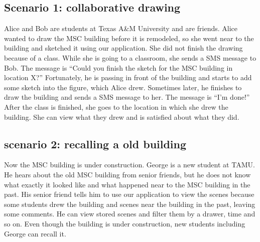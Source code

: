 \documentclass{www2010-submission}
\begin{document}
\subsection{Scenario 1: collaborative drawing}

Alice and Bob are students at Texas A\&M University and are friends. Alice
wanted to draw the MSC building before it is remodeled, so she went near to the
building and sketched it using our application. She did not finish the drawing
because of a class. While she is going to a classroom, she sends a SMS message
to Bob. The message is ``Could you finish the sketch for the MSC building in
location X?'' Fortunately, he is passing in front of the building and starts to
add some sketch into the figure, which Alice drew. Sometimes later, he finishes
to draw the building and sends a SMS message to her. The message is ``I'm
done!'' After the class is finished, she goes to the location in which she drew
the building. She can view what they drew and is satisfied about what they did.

\subsection{scenario 2: recalling a old building}

Now the MSC building is under construction. George is a new student at TAMU. He
hears about the old MSC building from senior friends, but he does not know what
exactly it looked like and what happened near to the MSC building in the past.
His senior friend tells him to use our application to view the scenes because
some students drew the building and scenes near the building in the past,
leaving some comments. He can view stored scenes and filter them by a drawer,
time and so on. Even though the building is under construction, new students
including George can recall it.





 
\end{document}
